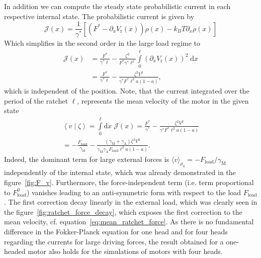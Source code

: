 \documentclass[aps,pre,twocolumn,showpacs,showkeys,superscriptaddress,floatfix]{revtex4-1}
\newcommand{\rmd}{{\mathrm d}}
\begin{document}
In addition we can compute the steady state probabilistic current in each respective internal state.
The probabilistic current is given by 
\[
\mathcal{J}(x) = \frac{1}{\gamma^*} \left[ \left( F^* - \partial_x V_\text{r}(x) \right) \rho(x) - k_B T \partial_x \rho(x) \right] 
\]
Which simplifies in the second order in the large load regime to
\begin{align*}
\mathcal{J}(x) 
&= \frac{F^*}{\gamma^* \ell} - \frac{\zeta^2}{F^* \gamma^* \ell^2} \int\limits^\ell_0 \left( \partial_x V_\text{r}(x) \right)^2 \; \rmd x \\
&= \frac{F^*}{\gamma^* \ell} - \frac{\zeta^2 V^2}{\gamma^* F^* \ell^3 a (1-a) } ,
\end{align*}
which is independent of the position. 
Note, that the current integrated over the period of the ratchet $\ell$, represents the mean velocity of the motor in the given state
\begin{multline}
\left\langle v \middle| \zeta \right\rangle 
= \int\limits_0^\ell \rmd x \; {\mathcal J}(x) 
= \frac{F^*}{\gamma^*} - \frac{\zeta^2 V^2}{\gamma^* F^* \ell^2 a (1-a) } 
\\
= - \frac{F_\text{load}}{\gamma_\text{M}} - \frac{ ( \gamma_\text{M} + \gamma_\text{A} ) \zeta^2 V^2}{\gamma_\text{M} \gamma_\text{A} F_\text{load} \ell^2 a (1-a) } .
\label{eq:mean_velocity_large}
\end{multline}
Indeed, the dominant term for large external forces is $\langle v \rangle_{\rho_0} = - F_\text{load} / \gamma_\text{M}$ independently of the internal state, 
which was already demonstrated in the figure~\ref{fig:F_v}. 
Furthermore, the force-independent term (i.e. term proportional to $F_\text{load}^0$) vanishes leading to an anti-symmetric form with respect to the load $F_\text{load}$. 
The first correction decay linearly in the external load, which was clearly seen in the figure~\ref{fig:ratchet_force_decay}, 
which exposes the first correction to the mean velocity, cf. equation~\eqref{eq:mean_ratchet_force}. 
As there is no fundamental difference in the Fokker-Planck equation for one head and for four heads regarding the currents for large driving forces, 
the result obtained for a one-headed motor also holds for the simulations of motors with four heads. 


\end{document}
